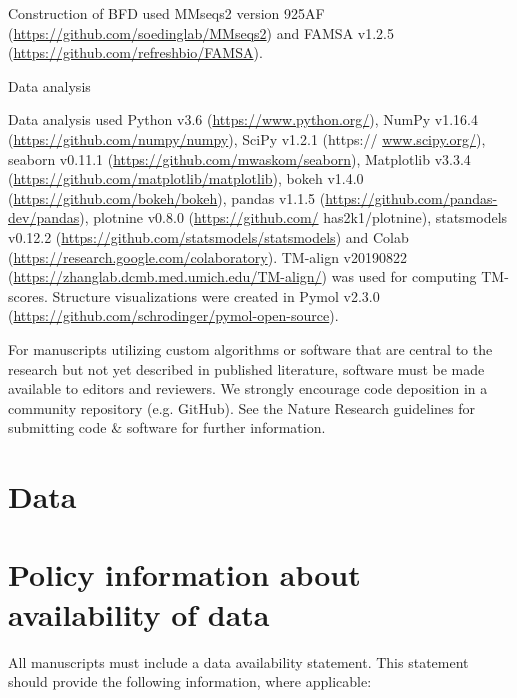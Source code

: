 \documentclass[10pt]{article}
\begin{document}
Construction of BFD used MMseqs2 version 925AF (\href{https://github.com/soedinglab/MMseqs2}{https://github.com/soedinglab/MMseqs2}) and FAMSA v1.2.5 (\href{https://github.com/refreshbio/FAMSA}{https://github.com/refreshbio/FAMSA}).

Data analysis

\begin{displayquote}
Data analysis used Python v3.6 (\href{https://www.python.org/}{https://www.python.org/}), NumPy v1.16.4 (\href{https://github.com/numpy/numpy}{https://github.com/numpy/numpy}), SciPy v1.2.1 (https:// \href{http://www.scipy.org/}{www.scipy.org/}), seaborn v0.11.1 (\href{https://github.com/mwaskom/seaborn}{https://github.com/mwaskom/seaborn}), Matplotlib v3.3.4 (\href{https://github.com/matplotlib/matplotlib}{https://github.com/matplotlib/matplotlib}), bokeh v1.4.0 (\href{https://github.com/bokeh/bokeh}{https://github.com/bokeh/bokeh}), pandas v1.1.5 (\href{https://github.com/pandas-dev/pandas}{https://github.com/pandas-dev/pandas}), plotnine v0.8.0 (\href{https://github.com/}{https://github.com/} has2k1/plotnine), statsmodels v0.12.2 (\href{https://github.com/statsmodels/statsmodels}{https://github.com/statsmodels/statsmodels}) and Colab (\href{https://research.google.com/colaboratory}{https://research.google.com/colaboratory}). TM-align v20190822 (\href{https://zhanglab.dcmb.med.umich.edu/TM-align/}{https://zhanglab.dcmb.med.umich.edu/TM-align/}) was used for computing TM-scores. Structure visualizations were created in Pymol v2.3.0 (\href{https://github.com/schrodinger/pymol-open-source}{https://github.com/schrodinger/pymol-open-source}).
\end{displayquote}

For manuscripts utilizing custom algorithms or software that are central to the research but not yet described in published literature, software must be made available to editors and reviewers. We strongly encourage code deposition in a community repository (e.g. GitHub). See the Nature Research guidelines for submitting code \& software for further information.

\section*{Data}
\section*{Policy information about availability of data}
All manuscripts must include a data availability statement. This statement should provide the following information, where applicable:
\end{document}
